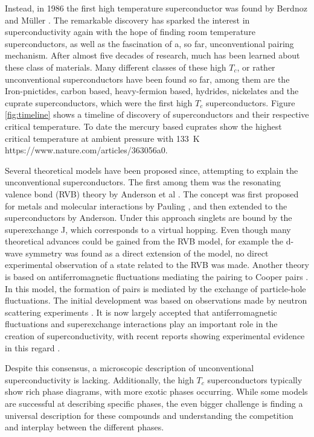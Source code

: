 Instead, in 1986 the first high temperature superconductor was found by Berdnoz and Müller \cite{bednorz_possible_1986}.
The remarkable discovery has sparked the interest in superconductivity again with the hope of finding room temperature superconductors, as well as the fascination of a, so far, unconventional pairing mechanism.
After almost five decades of research, much has been learned about these class of materials.
Many different classes of these high $T_c$, or rather unconventional superconductors have been found so far, among them are the Iron-pnictides, carbon based, heavy-fermion based, hydrides, nickelates and the cuprate superconductors, which were the first high $T_c$ superconductors.
Figure \ref{fig:timeline} shows a timeline of discovery of superconductors and their respective critical temperature.
To date the mercury based cuprates show the highest critical temperature at ambient pressure with \qty{133}{\kelvin} \cite{} https://www.nature.com/articles/363056a0.

Several theoretical models have been proposed since, attempting to explain the unconventional superconductors.
The first among them was the resonating valence bond (RVB) theory by Anderson et al \cite{anderson_resonating_1973,anderson_resonating--valence-bond_1987}.
The concept was first proposed for metals and molecular interactions by Pauling \cite{pauling_nature_1938, pauling_nature_1948}, and then extended to the superconductors by Anderson.
Under this approach singlets are bound by the superexchange J, which corresponds to a virtual hopping.
Even though many theoretical advances could be gained from the RVB model, for example the d-wave symmetry was found as a direct extension of the model, no direct experimental observation of a state related to the RVB was made.
Another theory is based on antiferromagnetic fluctuations mediating the pairing to Cooper pairs \cite{bickers_cdw_1987}.
In this model, the formation of pairs is mediated by the exchange of particle-hole fluctuations.
The initial development was based on observations made by neutron scattering experiments \cite{mook_polarized_1993,hayden_structure_2004,dahm_strength_2009}.
It is now largely accepted that antiferromagnetic fluctuations and superexchange interactions play an important role in the creation of superconductivity, with recent reports showing experimental evidence in this regard \cite{kowalski_oxygen_2021,omahony_electron_2022}.

Despite this consensus, a microscopic description of unconventional superconductivity is lacking.
Additionally, the high $T_c$ superconductors typically show rich phase diagrams, with more exotic phases occurring.
While some models are successful at describing specific phases, the even bigger challenge is finding a universal description for these compounds and understanding the competition and interplay between the different phases.


